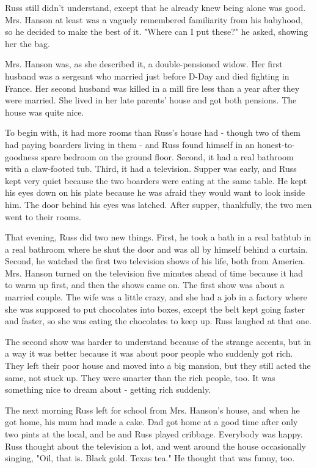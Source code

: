 \documentclass[a4paper,11pt]{article}
\begin{document}
Russ still didn't understand, except that he already knew being alone was good. Mrs. Hanson at least was a vaguely remembered familiarity from his babyhood, so he decided to make the best of it. "Where can I put these?" he asked, showing her the bag.

Mrs. Hanson was, as she described it, a double-pensioned widow. Her first husband was a sergeant who married just before D-Day and died fighting in France. Her second husband was killed in a mill fire less than a year after they were married. She lived in her late parents' house and got both pensions. The house was quite nice.

To begin with, it had more rooms than Russ's house had - though two of them had paying boarders living in them - and Russ found himself in an honest-to-goodness spare bedroom on the ground floor. Second, it had a real bathroom with a claw-footed tub. Third, it had a television. Supper was early, and Russ kept very quiet because the two boarders were eating at the same table. He kept his eyes down on his plate because he was afraid they would want to look inside him. The door behind his eyes was latched. After supper, thankfully, the two men went to their rooms.

That evening, Russ did two new things. First, he took a bath in a real bathtub in a real bathroom where he shut the door and was all by himself behind a curtain. Second, he watched the first two television shows of his life, both from America. Mrs. Hanson turned on the television five minutes ahead of time because it had to warm up first, and then the shows came on. The first show was about a married couple. The wife was a little crazy, and she had a job in a factory where she was supposed to put chocolates into boxes, except the belt kept going faster and faster, so she was eating the chocolates to keep up. Russ laughed at that one.

The second show was harder to understand because of the strange accents, but in a way it was better because it was about poor people who suddenly got rich. They left their poor house and moved into a big mansion, but they still acted the same, not stuck up. They were smarter than the rich people, too. It was something nice to dream about - getting rich suddenly.

The next morning Russ left for school from Mrs. Hanson's house, and when he got home, his mum had made a cake. Dad got home at a good time after only two pints at the local, and he and Russ played cribbage. Everybody was happy. Russ thought about the television a lot, and went around the house occasionally singing, "Oil, that is. Black gold. Texas tea." He thought that was funny, too.
\end{document}
